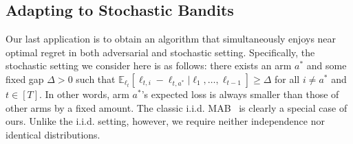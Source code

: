\documentclass[final, 12pt]{colt2018} %
\begin{document}

\subsection{Adapting to Stochastic Bandits}
\label{section:best of both worlds}
Our last application is to obtain an algorithm that simultaneously enjoys near optimal regret in both adversarial and stochastic setting. 
Specifically, the stochastic setting we consider here is as follows: there exists an arm $a^*$ and some fixed gap $\Delta > 0$ such that 
$\mathbb{E}_{\ell_t}\left[\ell_{t,i}-\ell_{t,a^*} | \ell_1, \ldots, \ell_{t-1}\right]\geq \Delta$ for all $i \neq a^*$ and $t\in[T]$.
In other words, arm $a^*$'s expected loss is always smaller than those of other arms by a fixed amount.
The classic i.i.d. MAB~\citep{lai1985asymptotically} is clearly a special case of ours.
Unlike the i.i.d. setting, however, we require neither independence nor identical distributions.
\end{document}
